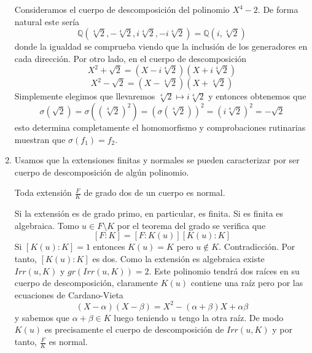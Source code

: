 \begin{enumerate}
Consideramos el cuerpo de descomposición del polinomio $X^4-2$. De forma natural este sería $$\mathbb{Q}(\sqrt[4]{2},-\sqrt[4]{2},i\sqrt[4]{2},-i\sqrt[4]{2}) = \mathbb{Q}(i,\sqrt[4]{2})$$ donde la igualdad se comprueba viendo que la inclusión de los generadores en cada dirección. Por otro lado, en el cuerpo de descomposición $$X^2 + \sqrt{2} = (X - i \sqrt[4]{2})(X + i \sqrt[4]{2})$$ $$X^2 - \sqrt{2} = (X - \sqrt[4]{2})(X + \sqrt[4]{2})$$ Simplemente elegimos que llevaremos $\sqrt[4]{2} \mapsto i \sqrt[4]{2}$ y entonces obtenemos que $$\sigma(\sqrt{2}) = \sigma((\sqrt[4]{2})^2) = (\sigma(\sqrt[4]{2}))^2 = (i \sqrt[4]{2})^2 = - \sqrt{2}$$ esto determina completamente el homomorfismo y comprobaciones rutinarias muestran que $\sigma(f_1) = f_2$. 

\item Usamos que la extensiones finitas y normales se pueden caracterizar por ser cuerpo de descomposición de algún polinomio. 

\begin{proposition}
Toda extensión $\frac{F}{K}$ de grado dos de un cuerpo es normal.
\end{proposition}
 

Si la extensión es de grado primo, en particular, es finita. Si es finita es algebraica. Tomo $u \in F \setminus K$ por el teorema del grado se verifica que $$[F:K] = [F:K(u)][K(u):K]$$ Si $[K(u):K] = 1$ entonces $K(u) = K$ pero $u \notin K$. Contradicción. Por tanto, $[K(u):K]$ es dos. Como la extensión es algebraica existe $Irr(u,K)$ y $gr(Irr(u,K)) = 2$. Este polinomio tendrá dos raíces en su cuerpo de descomposición, claramente $K(u)$ contiene una raíz pero por las ecuaciones de Cardano-Vieta $$(X - \alpha)(X - \beta) = X^2 - (\alpha+\beta)X + \alpha\beta$$ y sabemos que $\alpha + \beta \in K$ luego teniendo $u$ tengo la otra raíz. De modo $K(u)$ es precisamente el cuerpo de descomposición de $Irr(u,K)$ y por tanto, $\frac{F}{K}$ es normal. 


\end{enumerate}
